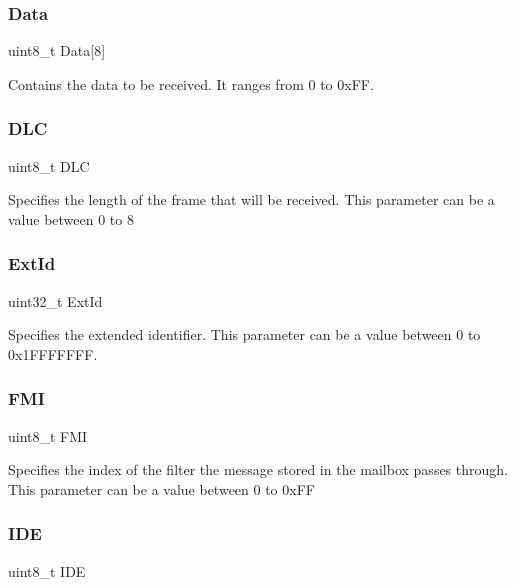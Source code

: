 \subsubsection{\texorpdfstring{Data}{Data}}
{\footnotesize\ttfamily uint8\+\_\+t Data\mbox{[}8\mbox{]}}

Contains the data to be received. It ranges from 0 to 0x\+FF. \mbox{\label{struct_can_rx_msg_a5f86974a53a85fb5706e08f8106296b9}} 
\subsubsection{\texorpdfstring{DLC}{DLC}}
{\footnotesize\ttfamily uint8\+\_\+t D\+LC}

Specifies the length of the frame that will be received. This parameter can be a value between 0 to 8 \mbox{\label{struct_can_rx_msg_a8625d2aaf6b0b99f0faf0b8cd07debd4}} 
\subsubsection{\texorpdfstring{ExtId}{ExtId}}
{\footnotesize\ttfamily uint32\+\_\+t Ext\+Id}

Specifies the extended identifier. This parameter can be a value between 0 to 0x1\+F\+F\+F\+F\+F\+FF. \mbox{\label{struct_can_rx_msg_af219946419093720aad14ef427f3cde4}} 
\subsubsection{\texorpdfstring{FMI}{FMI}}
{\footnotesize\ttfamily uint8\+\_\+t F\+MI}

Specifies the index of the filter the message stored in the mailbox passes through. This parameter can be a value between 0 to 0x\+FF \mbox{\label{struct_can_rx_msg_accecf260a60cf687f0f9898421aeea86}} 
\subsubsection{\texorpdfstring{IDE}{IDE}}
{\footnotesize\ttfamily uint8\+\_\+t I\+DE}

